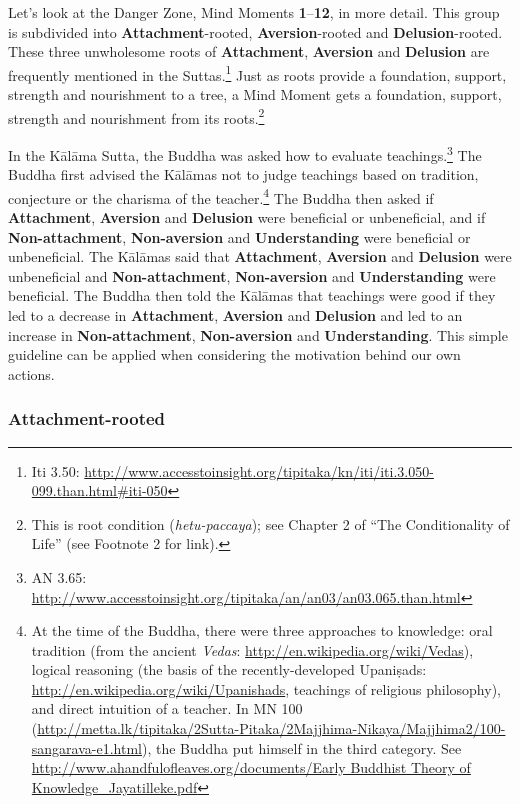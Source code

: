 Let’s look at the Danger Zone, Mind Moments \textbf{1}--\textbf{12}, in more detail. This group is subdivided into \textbf{Attachment}-rooted, \textbf{Aversion}-rooted and \textbf{Delusion}-rooted. These three unwholesome roots of \textbf{Attachment}, \textbf{Aversion} and \textbf{Delusion} are frequently  mentioned in the Suttas.\footnote{Iti 3.50: \url{http://www.accesstoinsight.org/tipitaka/kn/iti/iti.3.050-099.than.html\#iti-050}} Just as roots provide a foundation, support, strength and nourishment to a tree, a Mind Moment gets a foundation, support, strength and nourishment from its roots.\footnote{This is root condition (\textit{hetu-paccaya}); see Chapter 2 of “The Conditionality of Life” (see Footnote 2 for link).}

\pagebreak

In the Kālāma Sutta, the Buddha was asked how to evaluate teachings.\footnote{AN 3.65: \url{http://www.accesstoinsight.org/tipitaka/an/an03/an03.065.than.html}} The Buddha first advised the Kālāmas not to judge teachings based on tradition, conjecture or the charisma of the teacher.\footnote{At the time of the Buddha, there were three approaches to knowledge: oral tradition (from the ancient \textit{Vedas}: \url{http://en.wikipedia.org/wiki/Vedas}), logical reasoning (the basis of the recently-developed Upaniṣads: \url{http://en.wikipedia.org/wiki/Upanishads}, teachings of religious philosophy), and direct intuition of a teacher. In MN 100 (\url{http://metta.lk/tipitaka/2Sutta-Pitaka/2Majjhima-Nikaya/Majjhima2/100-sangarava-e1.html}), the Buddha put himself in the third category. See \url{http://www.ahandfulofleaves.org/documents/Early Buddhist Theory of Knowledge_Jayatilleke.pdf}} The Buddha then asked if \textbf{Attachment}, \textbf{Aversion} and \textbf{Delusion} were beneficial or unbeneficial, and if \textbf{Non-attachment}, \textbf{Non-aversion} and \textbf{Understanding} were beneficial or unbeneficial. The Kālāmas said that \textbf{Attachment}, \textbf{Aversion} and \textbf{Delusion} were unbeneficial and \textbf{Non-attachment}, \textbf{Non-aversion} and \textbf{Understanding} were beneficial. The Buddha then told the Kālāmas that teachings were good if they led to a decrease in \textbf{Attachment}, \textbf{Aversion} and \textbf{Delusion} and led to an increase in \textbf{Non-attachment}, \textbf{Non-aversion} and \textbf{Understanding}. This simple guideline can be applied when considering the motivation behind our own actions.

\subsubsection*{\textbf{Attachment}-rooted}

